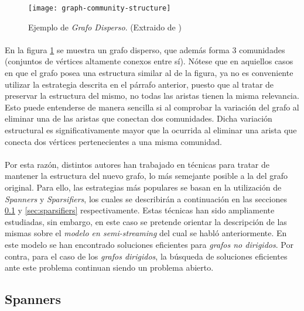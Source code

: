 \documentclass{subfiles}
\begin{document}
      \begin{figure}
        \centering
        \texttt{[image: graph-community-structure]}
        \caption{Ejemplo de \emph{Grafo Disperso}. (Extraido de \cite{wiki:Community_structure})}
        \label{img:graph_community_structure}
      \end{figure}

      \paragraph{}
      En la figura \ref{img:graph_community_structure} se muestra un grafo disperso, que además forma 3 comunidades (conjuntos de vértices altamente conexos entre sí). Nótese que en aquiellos casos en que el grafo posea una estructura similar al de la figura, ya no es conveniente utilizar la estrategia descrita en el párrafo anterior, puesto que al tratar de preservar la estructura del mismo, no todas las aristas tienen la misma relevancia. Esto puede entenderse de manera sencilla si al comprobar la variación del grafo al eliminar una de las aristas que conectan dos comunidades. Dicha variación estructural es significativamente mayor que la ocurrida al eliminar una arista que conecta dos vértices pertenecientes a una misma comunidad.

      \paragraph{}
      Por esta razón, distintos autores han trabajado en técnicas para tratar de mantener la estructura del nuevo grafo, lo más semejante posible a la del grafo original. Para ello, las estrategias más populares se basan en la utilización de \emph{Spanners} y \emph{Sparsifiers}, los cuales se describirán a continuación en las secciones \ref{sec:spanners} y \ref{sec:sparsifiers} respectivamente. Estas técnicas han sido ampliamente estudiadas, sin embargo, en este caso se pretende orientar la descripción de las mismas sobre el \emph{modelo en semi-streaming} del cual se habló anteriormente. En este modelo se han encontrado soluciones eficientes para \emph{grafos no dirigidos}. Por contra, para el caso de los \emph{grafos dirigidos}, la búsqueda de soluciones eficientes ante este problema continuan siendo un problema abierto.

      \subsection{Spanners}
      \label{sec:spanners}
\end{document}
